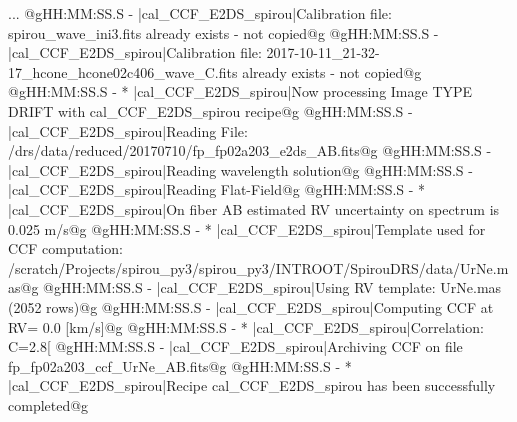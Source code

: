 \begin{cmdboxprintspecial}[fontupper=\tiny, fontlower=\tiny]
...
@gHH:MM:SS.S -   |cal_CCF_E2DS_spirou|Calibration file: spirou_wave_ini3.fits already exists - not copied@g
@gHH:MM:SS.S -   |cal_CCF_E2DS_spirou|Calibration file: 2017-10-11_21-32-17_hcone_hcone02c406_wave_C.fits already exists - not copied@g
@gHH:MM:SS.S - * |cal_CCF_E2DS_spirou|Now processing Image TYPE DRIFT with cal_CCF_E2DS_spirou recipe@g
@gHH:MM:SS.S -   |cal_CCF_E2DS_spirou|Reading File: /drs/data/reduced/20170710/fp_fp02a203_e2ds_AB.fits@g
@gHH:MM:SS.S -   |cal_CCF_E2DS_spirou|Reading wavelength solution@g
@gHH:MM:SS.S -   |cal_CCF_E2DS_spirou|Reading Flat-Field@g
@gHH:MM:SS.S - * |cal_CCF_E2DS_spirou|On fiber AB estimated RV uncertainty on spectrum is 0.025 m/s@g
@gHH:MM:SS.S - * |cal_CCF_E2DS_spirou|Template used for CCF computation: /scratch/Projects/spirou_py3/spirou_py3/INTROOT/SpirouDRS/data/UrNe.mas@g
@gHH:MM:SS.S -   |cal_CCF_E2DS_spirou|Using RV template: UrNe.mas (2052 rows)@g
@gHH:MM:SS.S -   |cal_CCF_E2DS_spirou|Computing CCF at RV=    0.0 [km/s]@g
@gHH:MM:SS.S - * |cal_CCF_E2DS_spirou|Correlation: C=2.8[%
@gHH:MM:SS.S -   |cal_CCF_E2DS_spirou|Archiving CCF on file fp_fp02a203_ccf_UrNe_AB.fits@g
@gHH:MM:SS.S - * |cal_CCF_E2DS_spirou|Recipe cal_CCF_E2DS_spirou has been successfully completed@g
\end{cmdboxprintspecial}






